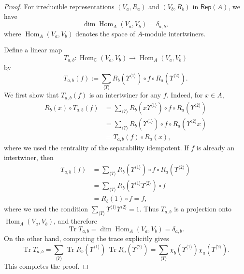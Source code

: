 \documentclass[a4paper,11pt]{article}
\theoremstyle{definition}
\theoremstyle{remark}
\newcommand{\Cbb}{\mathbb{C}}
\newcommand{\Rep}{\mathsf{Rep}}
\newcommand\Tr{\operatorname{Tr}}
\newcommand{\Hom}{\operatorname{Hom}}
\begin{document}
\begin{proof}
For irreducible representations $(V_a,R_a)$ and $(V_b,R_b)$ in $\Rep(A)$, we have
\begin{equation*}
\dim \Hom_A(V_a,V_b)=\delta_{a,b},
\end{equation*}
where $\Hom_A(V_a,V_b)$ denotes the space of $A$-module intertwiners.

Define a linear map
\begin{equation*}
T_{a,b}:\Hom_{\Cbb}(V_a,V_b)\longrightarrow \Hom_A(V_a,V_b)
\end{equation*}
by
\begin{equation*}
T_{a,b}(f)
:=
\sum_{\langle \Upsilon\rangle}
R_b(\Upsilon^{\langle 1\rangle})
\circ f \circ
R_a(\Upsilon^{\langle 2\rangle}).
\end{equation*}
We first show that $T_{a,b}(f)$ is an intertwiner for any $f$. Indeed, for $x\in A$,
\begin{equation*}
\begin{aligned}
R_b(x)\circ T_{a,b}(f)
&=
\sum_{\langle \Upsilon\rangle}
R_b(x\Upsilon^{\langle 1\rangle})
\circ f \circ
R_a(\Upsilon^{\langle 2\rangle}) \\
&=
\sum_{\langle \Upsilon\rangle}
R_b(\Upsilon^{\langle 1\rangle})
\circ f \circ
R_a(\Upsilon^{\langle 2\rangle}x) \\
&=
T_{a,b}(f)\circ R_a(x),
\end{aligned}
\end{equation*}
where we used the centrality of the separability idempotent.
If $f$ is already an intertwiner, then
\begin{equation*}
\begin{aligned}
T_{a,b}(f)
&=
\sum_{\langle \Upsilon\rangle}
R_b(\Upsilon^{\langle 1\rangle})
\circ f \circ
R_a(\Upsilon^{\langle 2\rangle}) \\
&=
\sum_{\langle \Upsilon\rangle}
R_b(\Upsilon^{\langle 1\rangle}\Upsilon^{\langle 2\rangle})
\circ f \\
&=
R_b(1)\circ f
=
f,
\end{aligned}
\end{equation*}
where we used the condition
$\sum_{\langle \Upsilon\rangle}
\Upsilon^{\langle 1\rangle}\Upsilon^{\langle 2\rangle}=1$.
Thus $T_{a,b}$ is a projection onto $\Hom_A(V_a,V_b)$, and therefore
\begin{equation*}
\Tr T_{a,b}
=
\dim \Hom_A(V_a,V_b)
=
\delta_{a,b}.
\end{equation*}
On the other hand, computing the trace explicitly gives
\begin{equation*}
\Tr T_{a,b}
=
\sum_{\langle \Upsilon\rangle}
\Tr R_b(\Upsilon^{\langle 1\rangle})
\,
\Tr R_a(\Upsilon^{\langle 2\rangle})
=
\sum_{\langle \Upsilon\rangle}
\chi_b(\Upsilon^{\langle 1\rangle})
\chi_a(\Upsilon^{\langle 2\rangle}).
\end{equation*}
This completes the proof.
\end{proof}
\end{document}
